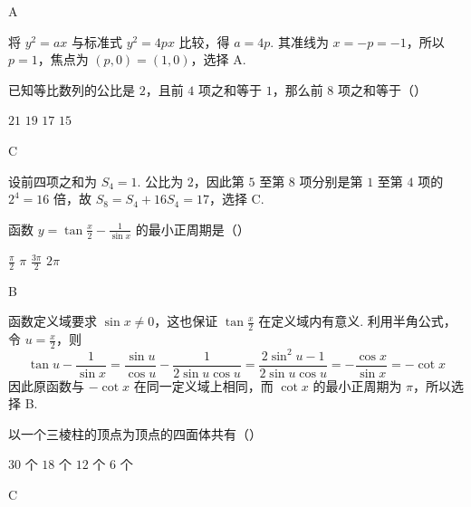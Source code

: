 \begin{answer}
A
\end{answer}

\begin{solution}
将 \(y^2=ax\) 与标准式 \(y^2=4px\) 比较，得 \(a=4p\). 其准线为 \(x=-p=-1\)，所以 \(p=1\)，焦点为 \((p,0)=(1,0)\)，选择 A.
\end{solution}

\begin{problem}
已知等比数列的公比是 \(2\)，且前 \(4\) 项之和等于 \(1\)，那么前 \(8\) 项之和等于（\quad）

\choices
    {\(21\)}
    {\(19\)}
    {\(17\)}
    {\(15\)}
\end{problem}

\begin{answer}
C
\end{answer}

\begin{solution}
设前四项之和为 \(S_4=1\). 公比为 \(2\)，因此第 \(5\) 至第 \(8\) 项分别是第 \(1\) 至第 \(4\) 项的 \(2^4=16\) 倍，故 \(S_8=S_4+16S_4=17\)，选择 C.
\end{solution}

\begin{problem}
函数 \(y=\tan\frac{x}{2}-\frac{1}{\sin x}\) 的最小正周期是（\quad）

\choices
    {\(\frac{\pi}{2}\)}
    {\(\pi\)}
    {\(\frac{3\pi}{2}\)}
    {\(2\pi\)}
\end{problem}

\begin{answer}
B
\end{answer}

\begin{solution}
函数定义域要求 \(\sin x\ne0\)，这也保证 \(\tan\frac{x}{2}\) 在定义域内有意义. 利用半角公式，令 \(u=\frac{x}{2}\)，则
\[
\tan u-\frac{1}{\sin x}=\frac{\sin u}{\cos u}-\frac{1}{2\sin u\cos u}=\frac{2\sin^2u-1}{2\sin u\cos u}=-\frac{\cos x}{\sin x}=-\cot x
\]
因此原函数与 \(-\cot x\) 在同一定义域上相同，而 \(\cot x\) 的最小正周期为 \(\pi\)，所以选择 B.
\end{solution}

\begin{problem}
以一个三棱柱的顶点为顶点的四面体共有（\quad）

\choices
    {\(30\) 个}
    {\(18\) 个}
    {\(12\) 个}
    {\(6\) 个}
\end{problem}

\begin{answer}
C
\end{answer}

